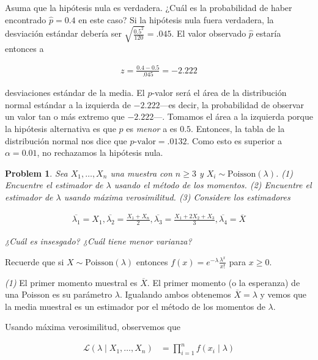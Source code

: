 \documentclass[a4paper, 12pt]{article}
\newtheorem{problem}{Problem}
\newtheorem{problem}{Problem}
\begin{document}
Asuma que la hipótesis nula es verdadera. ¿Cuál es la probabilidad de haber
encontrado $\hat{p} = 0.4$ en este caso? Si la hipótesis nula fuera
verdadera, la desviación estándar debería ser $\sqrt{\frac{0.5^2}{120}} = .045
$. El valor observado $\hat{p}$ estaría entonces a

\begin{align*}
    z = \frac{0.4 - 0.5}{.045} = -2.222
\end{align*}

desviaciones estándar de la media. El $p$-valor será el área de la distribución
normal estándar a la izquierda de $-2.222$---es decir, la probabilidad de
observar un valor tan o más extremo que $-2.222$---. Tomamos el área a la
izquierda porque la hipótesis alternativa es que $p$ es \textit{menor} a es
$0.5$. Entonces, la tabla de la distribución normal nos dice que $p\text{-valor}
= .0132$. Como esto es superior a $\alpha = 0.01$, no rechazamos la hipótesis
nula.

\pagebreak 

\begin{problem}
    Sea $X_1, \ldots, X_n$ una muestra con $n \geq 3$ y $X_i \sim
    \text{Poisson}(\lambda)$. \textit{(1)} Encuentre el estimador de $\lambda$
    usando el método de los momentos. \textit{(2)} Encuentre el estimador de
    $\lambda$ usando máxima verosimilitud. \textit{(3)} Considere los
    estimadores 

    \begin{align*}
        \overline{\lambda_1} = X_1, \overline{\lambda_2} = \frac{X_1 + X_n}{2},
        \overline{\lambda_3} = \frac{X_1 + 2X_2 + X_3}{3}, \overline{\lambda_4}
        = \overline{X}
    \end{align*}

    ¿Cuál es insesgado? ¿Cuál tiene menor varianza?
\end{problem}

Recuerde que si $X \sim \text{Poisson}(\lambda)$ entonces $f(x) = e^{-\lambda}
\frac{\lambda^x}{x!}$ para $x \geq 0$.

\textit{(1)} El primer momento muestral es $\overline{X}$. El primer momento (o
la esperanza) de una Poisson es su parámetro $\lambda$. Igualando ambos
obtenemos $\overline{X} = \lambda$ y vemos que la media muestral es un estimador
por el método de los momentos de $\lambda$. 

Usando máxima verosimilitud, observemos que 

\begin{align*}
    \mathcal{L}(\lambda \mid X_1, \ldots, X_n) &= \prod_{i=1}^{n} f(x_i \mid
    \lambda)   \\ 
\end{align*}
\end{document}
